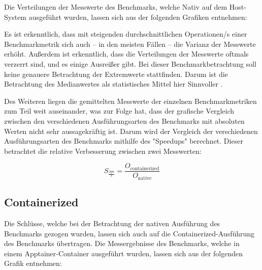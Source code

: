 Die Verteilungen der Messwerte des Benchmarks, welche Nativ auf dem Host-System ausgeführt wurden, lassen sich aus der folgenden Grafiken entnehmen:







\FloatBarrier

Es ist erkenntlich, dass mit steigenden durchschnittlichen Operationen/s einer Benchmarkmetrik sich auch – in den meisten Fällen – die Varianz der Messwerte erhöht. Außerdem ist erkenntlich, dass die Verteilungen der Messwerte oftmals verzerrt sind, und es einige Ausreißer gibt. Bei dieser Benchmarkbetrachtung soll keine genauere Betrachtung der Extremwerte stattfinden. Darum ist die Betrachtung des Medianwertes als statistisches Mittel hier Sinnvoller \cite[Vgl. 15f.]{stengelStatistikUndAufbereitung2011}. 

Des Weiteren liegen die gemittelten Messwerte der einzelnen Benchmarkmetriken zum Teil weit auseinander, was zur Folge hat, dass der grafische Vergleich zwischen den verschiedenen Ausführungsarten des Benchmarks mit absoluten Werten nicht sehr aussagekräftig ist. Darum wird der Vergleich der verschiedenen Ausführungsarten des Benchmarks mithilfe des "Speedups" berechnet. Dieser betrachtet die relative Verbesserung zwischen zwei Messwerten: 


\begin{equation}
S_{\frac{\text{ops}}{\text{s}}} = \frac{O_{\text{containerized}}}{O_{\text{native}}}
\end{equation}


\subsection{Containerized}

Die Schlüsse, welche bei der Betrachtung der nativen Ausführung des Benchmarks gezogen wurden, lassen sich auch auf die Containerized-Ausführung des Benchmarks übertragen. Die Messergebnisse des Benchmarks, welche in einem Apptainer-Container ausgeführt wurden, lassen sich aus der folgenden Grafik entnehmen:









